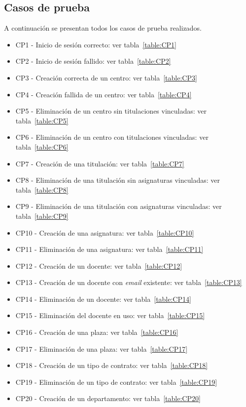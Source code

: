 \subsection{Casos de prueba}
A continuación se presentan todos los casos de prueba realizados.
\begin{itemize}
\item CP1 - Inicio de sesión correcto: ver tabla~\ref{table:CP1}
\item CP2 - Inicio de sesión fallido: ver tabla~\ref{table:CP2}
\item CP3 - Creación correcta de un centro: ver tabla~\ref{table:CP3}
\item CP4 - Creación fallida de un centro: ver tabla~\ref{table:CP4}
\item CP5 - Eliminación de un centro sin titulaciones vinculadas: ver tabla~\ref{table:CP5}
\item CP6 - Eliminación de un centro con titulaciones vinculadas: ver tabla~\ref{table:CP6}
\item CP7 - Creación de una titulación: ver tabla~\ref{table:CP7}
\item CP8 - Eliminación de una titulación sin asignaturas vinculadas: ver tabla~\ref{table:CP8}
\item CP9 - Eliminación de una titulación con asignaturas vinculadas: ver tabla~\ref{table:CP9}
\item CP10 - Creación de una asignatura: ver tabla~\ref{table:CP10}
\item CP11 - Eliminación de una asignatura: ver tabla~\ref{table:CP11}
\item CP12 - Creación de un docente: ver tabla~\ref{table:CP12}
\item CP13 - Creación de un docente con \textit{email} existente: ver tabla~\ref{table:CP13}
\item CP14 - Eliminación de un docente: ver tabla~\ref{table:CP14}
\item CP15 - Eliminación del docente en uso: ver tabla~\ref{table:CP15}
\item CP16 - Creación de una plaza: ver tabla~\ref{table:CP16}
\item CP17 - Eliminación de una plaza: ver tabla~\ref{table:CP17}
\item CP18 - Creación de un tipo de contrato: ver tabla~\ref{table:CP18}
\item CP19 - Eliminación de un tipo de contrato: ver tabla~\ref{table:CP19}
\item CP20 - Creación de un departamento: ver tabla~\ref{table:CP20}

\end{itemize}
